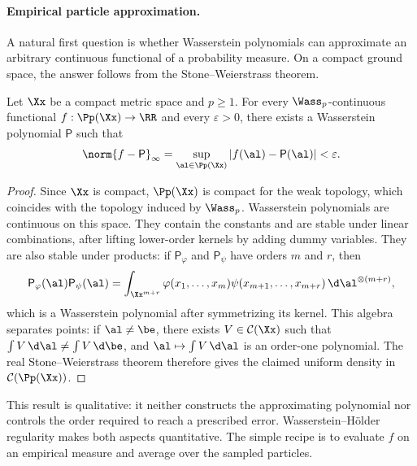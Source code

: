 \paragraph{Empirical particle approximation.}

A natural first question is whether Wasserstein polynomials can approximate an arbitrary continuous functional of a probability measure. On a compact ground space, the answer follows from the Stone--Weierstrass theorem.

\begin{prop}\label{prop-density-wasserstein-polynomials}
	Let \(\Xx\) be a compact metric space and \(p\geq1\). For every \(\Wass_p\)-continuous functional \(f:\Pp(\Xx)\to\RR\) and every \(\varepsilon>0\), there exists a Wasserstein polynomial \(\mathsf P\) such that
	\[
		\norm{f-\mathsf P}_{\infty}
		=
		\sup_{\al\in\Pp(\Xx)}|f(\al)-\mathsf P(\al)|
		<\varepsilon.
	\]
\end{prop}
\begin{proof}
	Since \(\Xx\) is compact, \(\Pp(\Xx)\) is compact for the weak topology, which coincides with the topology induced by \(\Wass_p\). Wasserstein polynomials are continuous on this space. They contain the constants and are stable under linear combinations, after lifting lower-order kernels by adding dummy variables. They are also stable under products: if \(\mathsf P_\varphi\) and \(\mathsf P_\psi\) have orders \(m\) and \(r\), then
	\[
		\mathsf P_\varphi(\al)\mathsf P_\psi(\al)
		=
		\int_{\Xx^{m+r}}
		\varphi(x_1,\ldots,x_m)\psi(x_{m+1},\ldots,x_{m+r})
		\,\d\al^{\otimes(m+r)},
	\]
	which is a Wasserstein polynomial after symmetrizing its kernel. This algebra separates points: if \(\al\neq\be\), there exists \(V\in\mathcal C(\Xx)\) such that \(\int V\,\d\al\neq\int V\,\d\be\), and \(\al\mapsto\int V\,\d\al\) is an order-one polynomial. The real Stone--Weierstrass theorem therefore gives the claimed uniform density in \(\mathcal C(\Pp(\Xx))\).
\end{proof}

This result is qualitative: it neither constructs the approximating polynomial nor controls the order required to reach a prescribed error. Wasserstein--H\"older regularity makes both aspects quantitative. The simple recipe is to evaluate \(f\) on an empirical measure and average over the sampled particles.

